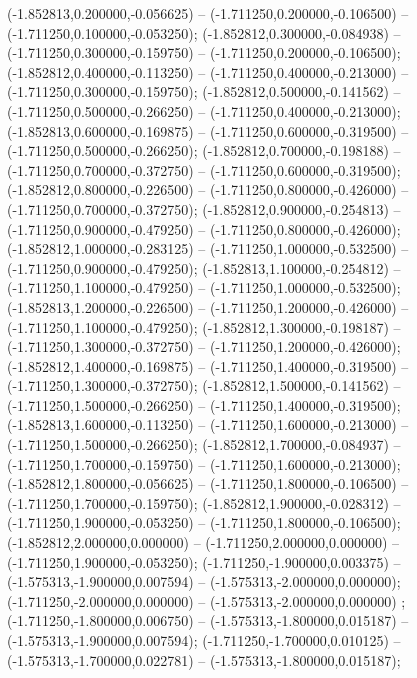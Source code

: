  (-1.852813,0.200000,-0.056625) -- (-1.711250,0.200000,-0.106500) -- (-1.711250,0.100000,-0.053250);
 (-1.852812,0.300000,-0.084938) -- (-1.711250,0.300000,-0.159750) -- (-1.711250,0.200000,-0.106500);
 (-1.852812,0.400000,-0.113250) -- (-1.711250,0.400000,-0.213000) -- (-1.711250,0.300000,-0.159750);
 (-1.852812,0.500000,-0.141562) -- (-1.711250,0.500000,-0.266250) -- (-1.711250,0.400000,-0.213000);
 (-1.852813,0.600000,-0.169875) -- (-1.711250,0.600000,-0.319500) -- (-1.711250,0.500000,-0.266250);
 (-1.852812,0.700000,-0.198188) -- (-1.711250,0.700000,-0.372750) -- (-1.711250,0.600000,-0.319500);
 (-1.852812,0.800000,-0.226500) -- (-1.711250,0.800000,-0.426000) -- (-1.711250,0.700000,-0.372750);
 (-1.852812,0.900000,-0.254813) -- (-1.711250,0.900000,-0.479250) -- (-1.711250,0.800000,-0.426000);
 (-1.852812,1.000000,-0.283125) -- (-1.711250,1.000000,-0.532500) -- (-1.711250,0.900000,-0.479250);
 (-1.852813,1.100000,-0.254812) -- (-1.711250,1.100000,-0.479250) -- (-1.711250,1.000000,-0.532500);
 (-1.852813,1.200000,-0.226500) -- (-1.711250,1.200000,-0.426000) -- (-1.711250,1.100000,-0.479250);
 (-1.852812,1.300000,-0.198187) -- (-1.711250,1.300000,-0.372750) -- (-1.711250,1.200000,-0.426000);
 (-1.852812,1.400000,-0.169875) -- (-1.711250,1.400000,-0.319500) -- (-1.711250,1.300000,-0.372750);
 (-1.852812,1.500000,-0.141562) -- (-1.711250,1.500000,-0.266250) -- (-1.711250,1.400000,-0.319500);
 (-1.852813,1.600000,-0.113250) -- (-1.711250,1.600000,-0.213000) -- (-1.711250,1.500000,-0.266250);
 (-1.852812,1.700000,-0.084937) -- (-1.711250,1.700000,-0.159750) -- (-1.711250,1.600000,-0.213000);
 (-1.852812,1.800000,-0.056625) -- (-1.711250,1.800000,-0.106500) -- (-1.711250,1.700000,-0.159750);
 (-1.852812,1.900000,-0.028312) -- (-1.711250,1.900000,-0.053250) -- (-1.711250,1.800000,-0.106500);
 (-1.852812,2.000000,0.000000) -- (-1.711250,2.000000,0.000000) -- (-1.711250,1.900000,-0.053250);
 (-1.711250,-1.900000,0.003375) -- (-1.575313,-1.900000,0.007594) -- (-1.575313,-2.000000,0.000000);
 (-1.711250,-2.000000,0.000000) -- (-1.575313,-2.000000,0.000000) ;
 (-1.711250,-1.800000,0.006750) -- (-1.575313,-1.800000,0.015187) -- (-1.575313,-1.900000,0.007594);
 (-1.711250,-1.700000,0.010125) -- (-1.575313,-1.700000,0.022781) -- (-1.575313,-1.800000,0.015187);
